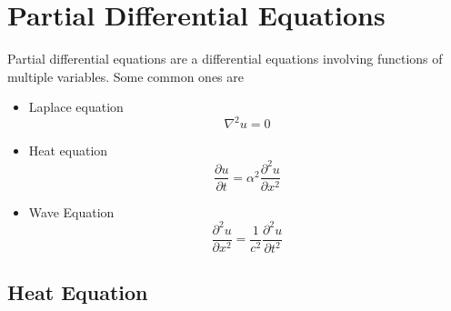 \documentclass[11pt, fleqn]{article}
\begin{document}

\section{Partial Differential Equations}
Partial differential equations are a differential equations involving functions of multiple variables. Some common ones are
\begin{itemize}
    \item Laplace equation
    $$\nabla^2 u=0$$
    \item Heat equation
    $$\frac{\partial u}{\partial t}=\alpha^2\frac{\partial^2u}{\partial x^2}$$
    \item Wave Equation
    $$\frac{\partial^2u}{\partial x^2}=\frac{1}{c^2}\frac{\partial^2 u}{\partial t^2}$$
\end{itemize}
\subsection{Heat Equation}
\end{document}
